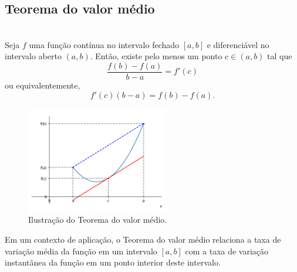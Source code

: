 \cleardoublepage\documentclass[../main.tex]{subfiles}
\begin{document}
\subsection{Teorema do valor médio }
\begin{framed}
\begin{teo}~
 \\ Seja $f$ uma função contínua no intervalo fechado $[a,b]$ e diferenciável no intervalo aberto $(a,b)$. Então, existe pelo menos um ponto $c\in (a,b)$ tal que
  \begin{equation}
    \frac{f(b)-f(a)}{b-a}=f'(c)
  \end{equation}
  ou equivalentemente,
\[ f'(c)(b-a)=f(b)-f(a). \]
\end{teo}\end{framed}
\begin{figure}[h]
  \centering
  \includegraphics[width=0.55\textwidth]{./fig_apl_deriv/fig_teo_valmed}
  \caption{Ilustração do Teorema do valor médio.}
  \label{fig:teo_valor_medio}
\end{figure}
\begin{obs}
  Em um contexto de aplicação, o Teorema do valor médio relaciona a taxa de variação média da função em um intervalo $[a, b]$ com a taxa de variação instantânea da função em um ponto interior deste intervalo.
\end{obs}
\end{document}
